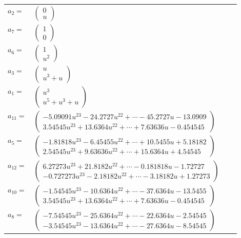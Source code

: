 \documentclass[1p]{elsarticle_modified}
\theoremstyle{definition}
\begin{document}
\begin{tabular}{m{7pt} m{180pt} m{7pt} m{180pt} }
\flushright $a_{2}=$&$\begin{pmatrix}0\\u\end{pmatrix}$ \\
\flushright $a_{7}=$&$\begin{pmatrix}1\\0\end{pmatrix}$ \\
\flushright $a_{6}=$&$\begin{pmatrix}1\\u^2\end{pmatrix}$ \\
\flushright $a_{3}=$&$\begin{pmatrix}u\\u^3+u\end{pmatrix}$ \\
\flushright $a_{1}=$&$\begin{pmatrix}u^3\\u^5+u^3+u\end{pmatrix}$ \\
\flushright $a_{11}=$&$\begin{pmatrix}-5.09091 u^{23}-24.2727 u^{22}+\cdots-45.2727 u-13.0909\\3.54545 u^{23}+13.6364 u^{22}+\cdots+7.63636 u-0.454545\end{pmatrix}$ \\
\flushright $a_{5}=$&$\begin{pmatrix}-1.81818 u^{23}-6.45455 u^{22}+\cdots+10.5455 u+5.18182\\2.54545 u^{23}+9.63636 u^{22}+\cdots+15.6364 u+4.54545\end{pmatrix}$ \\
\flushright $a_{12}=$&$\begin{pmatrix}6.27273 u^{23}+21.8182 u^{22}+\cdots-0.181818 u-1.72727\\-0.727273 u^{23}-2.18182 u^{22}+\cdots-3.18182 u+1.27273\end{pmatrix}$ \\
\flushright $a_{10}=$&$\begin{pmatrix}-1.54545 u^{23}-10.6364 u^{22}+\cdots-37.6364 u-13.5455\\3.54545 u^{23}+13.6364 u^{22}+\cdots+7.63636 u-0.454545\end{pmatrix}$ \\
\flushright $a_{8}=$&$\begin{pmatrix}-7.54545 u^{23}-25.6364 u^{22}+\cdots-22.6364 u-2.54545\\-3.54545 u^{23}-13.6364 u^{22}+\cdots-27.6364 u-8.54545\end{pmatrix}$ \\

\end{tabular}
\end{document}
